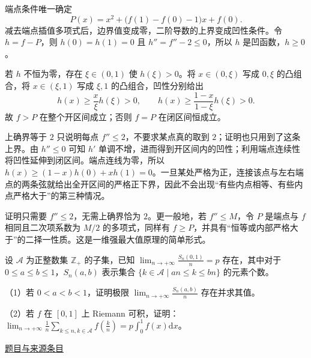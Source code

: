 \documentclass[UTF8,12pt,a4paper,fontset=fandol]{ctexart}
\begin{document}
\begin{solve}\label{ans:ch01-17th-A:5}

端点条件唯一确定
\[
P(x)=x^2+\bigl(f(1)-f(0)-1\bigr)x+f(0).
\]
减去端点插值多项式后，边界值变成零，二阶导数的上界变成凹性条件。令 $h=f-P$，则 $h(0)=h(1)=0$ 且 $h''=f''-2\leq0$，所以 $h$ 是凹函数，$h\geq0$。

若 $h$ 不恒为零，存在 $\xi\in(0,1)$ 使 $h(\xi)>0$。将 $x\in(0,\xi)$ 写成 $0,\xi$ 的凸组合，将 $x\in(\xi,1)$ 写成 $\xi,1$ 的凸组合，凹性分别给出
\[
h(x)\geq\frac{x}{\xi}h(\xi)>0,
\qquad
h(x)\geq\frac{1-x}{1-\xi}h(\xi)>0.
\]
故 $f>P$ 在整个开区间成立；否则 $f=P$ 在闭区间恒成立。

上确界等于 $2$ 只说明每点 $f''\le2$，不要求某点真的取到 $2$；证明也只用到了这条上界。由 $h''\le0$ 可知 $h'$ 单调不增，进而得到开区间内的凹性；利用端点连续性将凹性延伸到闭区间。端点连线为零，所以 $h(x)\ge(1-x)h(0)+xh(1)=0$。一旦某处严格为正，连接该点与左右端点的两条弦就给出全开区间的严格正下界，因此不会出现“有些内点相等、有些内点严格大于”的第三种情况。

\end{solve}

\begin{remark}[方法与条件]证明只需要 $f''\leq2$，无需上确界恰为 $2$。更一般地，若 $f''\leq M$，令 $P$ 是端点与 $f$ 相同且二次项系数为 $M/2$ 的多项式，同样有 $f\geq P$，并具有“恒等或内部严格大于”的二择一性质。这是一维强最大值原理的简单形式。\end{remark}

\begin{example}[来源序号6]\label{ex:ch01-17th-A:6}\label{pr:ch01-17th-A:6}

设 $\mathcal{A}$ 为正整数集 $\mathbb{Z}_+$ 的子集，已知 $\lim_{n \rightarrow +\infty} \frac{S_n(0,1)}{n} = p$ 存在，其中对于 $0 \leq a \leq b \leq 1$，$S_n(a,b)$ 表示集合 $\{k \in \mathcal{A} \mid an \leq k \leq bn\}$ 的元素个数。

（1）若 $0 < a < b < 1$，证明极限 $\lim_{n \rightarrow +\infty} \frac{S_n(a,b)}{n}$ 存在并求其值。

（2）若 $f$ 在 $[0,1]$ 上 Riemann 可积，证明：$\lim_{n \rightarrow +\infty} \frac{1}{n} \sum_{k \leq n, k \in \mathcal{A}} f\left(\frac{k}{n}\right) = p \int_0^1 f(x) \mathrm{d}x$。

\par\href{https://github.com/lzxcr/cmc-mathematics/blob/64916fa1fdbc3e444a652eca204d5669058ee321/src/problems/preliminary/17/06.md}{题目与来源条目}

\end{example}
\end{document}
